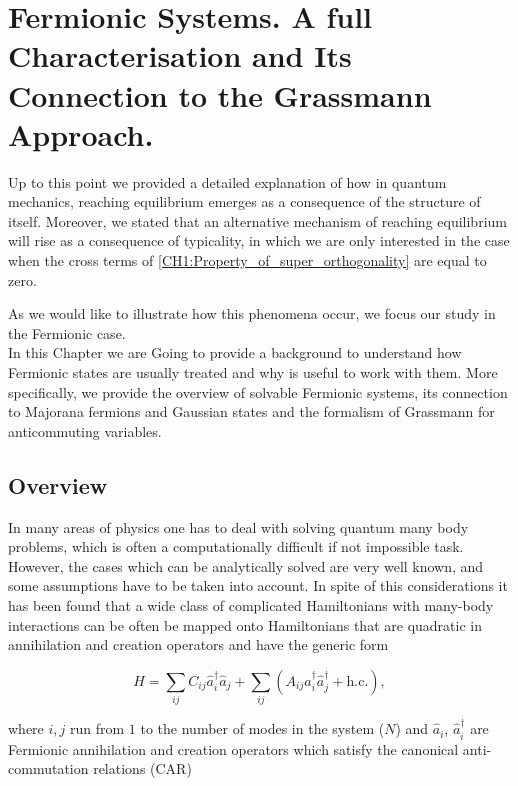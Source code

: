 \chapter{ Fermionic Systems. A full Characterisation and Its Connection to the Grassmann Approach.}
Up to this point we provided a detailed explanation of how in quantum mechanics, reaching equilibrium emerges as a consequence of the structure of itself. Moreover, we stated that an alternative mechanism of reaching equilibrium will rise as a consequence of typicality, in which we are only interested in the case when the cross terms of \eqref{CH1:Property_of_super_orthogonality} are equal to zero.

As we would like to illustrate how this phenomena occur, we focus our study in the Fermionic case.\\
\indent In this Chapter we are Going to provide a background to understand how Fermionic states are usually treated and why is useful to work with them. More specifically, we provide the overview of solvable Fermionic systems, its connection to Majorana fermions and Gaussian states and the formalism of Grassmann for anticommuting variables.
\section{Overview}
In many areas of physics one has to deal with solving quantum many body problems, which is often a computationally difficult if not impossible task. However, the cases which can be analytically solved are very well known, and some assumptions have to be taken into account. In spite of this considerations it has been found that a wide class of complicated Hamiltonians with many-body interactions can be often be mapped onto Hamiltonians that are quadratic in annihilation and creation operators and have the generic form \cite{botero_bcs-like_2004}

\begin{equation}
\hat{H}=\sum_{i j} C_{i j} \hat{a}_{i}^{\dagger} \hat{a}_{j}+\sum_{i j}\left(A_{i j} \hat{a}_{i}^{\dagger}\hat{a}_{j}^{\dagger}+\mathrm{h.c.}\right),
\label{CH2:QuadraticHamiltonian}
\end{equation}

where $i,j$ run from $1$ to the number of modes in the system ($N$) and $\hat{a}_i$, $\hat{a}^{\dagger}_i$ are Fermionic annihilation and creation operators which satisfy the canonical anti-commutation relations (CAR)\cite{fradkin_field_1997}

